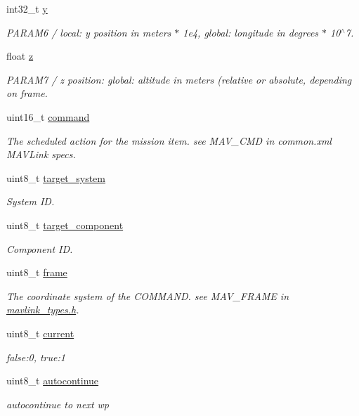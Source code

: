 \begin{DoxyCompactItemize}
int32\+\_\+t \hyperlink{struct____mavlink__command__int__t_a1316d8a8c1b2b2adb4fee1097615a2ba}{y}
\begin{DoxyCompactList}\small\item\em P\+A\+R\+A\+M6 / local\+: y position in meters $\ast$ 1e4, global\+: longitude in degrees $\ast$ 10$^\wedge$7. \end{DoxyCompactList}\item 
float \hyperlink{struct____mavlink__command__int__t_a1eb7cb747b12d83958b4efcd65c8f060}{z}
\begin{DoxyCompactList}\small\item\em P\+A\+R\+A\+M7 / z position\+: global\+: altitude in meters (relative or absolute, depending on frame. \end{DoxyCompactList}\item 
uint16\+\_\+t \hyperlink{struct____mavlink__command__int__t_a210e8661b405ea012003058debdd98ed}{command}
\begin{DoxyCompactList}\small\item\em The scheduled action for the mission item. see M\+A\+V\+\_\+\+C\+M\+D in common.\+xml M\+A\+V\+Link specs. \end{DoxyCompactList}\item 
uint8\+\_\+t \hyperlink{struct____mavlink__command__int__t_a5ff0fbd9f8c96ba3893dd5fce4967db0}{target\+\_\+system}
\begin{DoxyCompactList}\small\item\em System I\+D. \end{DoxyCompactList}\item 
uint8\+\_\+t \hyperlink{struct____mavlink__command__int__t_a3a78c0529d93b205f241dc0959793e6a}{target\+\_\+component}
\begin{DoxyCompactList}\small\item\em Component I\+D. \end{DoxyCompactList}\item 
uint8\+\_\+t \hyperlink{struct____mavlink__command__int__t_abf1f99246744ecd6c296286009c2684e}{frame}
\begin{DoxyCompactList}\small\item\em The coordinate system of the C\+O\+M\+M\+A\+N\+D. see M\+A\+V\+\_\+\+F\+R\+A\+M\+E in \hyperlink{mavlink__types_8h}{mavlink\+\_\+types.\+h}. \end{DoxyCompactList}\item 
uint8\+\_\+t \hyperlink{struct____mavlink__command__int__t_aa4f61af5513c289bdf1c0eeeb4f5d64d}{current}
\begin{DoxyCompactList}\small\item\em false\+:0, true\+:1 \end{DoxyCompactList}\item 
uint8\+\_\+t \hyperlink{struct____mavlink__command__int__t_a4ff5413c110651ecc428a47001d55d77}{autocontinue}
\begin{DoxyCompactList}\small\item\em autocontinue to next wp \end{DoxyCompactList}\end{DoxyCompactItemize}


